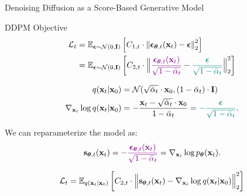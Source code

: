 \documentclass{beamer}
\renewcommand{\eqpause}{}
\renewcommand{\nextonslide}[1]{#1}
\begin{document}
\begin{frame}{Denoising Diffusion as a Score-Based Generative Model}
	\begin{block}{DDPM Objective}
		\vspace{-0.7cm}
		\begin{align*}
			\cL_t &= \bbE_{\bepsilon \sim \cN(0, \bI)} \left[ C_{1, t} \cdot \left\|  \bepsilon_{\btheta, t} (\bx_t) - \bepsilon\right\|_2^2  \right] \\
			\nextonslide{
			& = \bbE_{\bepsilon \sim \cN(0, \bI)} \left[ C_{2, t} \cdot \Bigl\| {\color{violet} \frac{\bepsilon_{\btheta, t}  (\bx_t) }{\sqrt{1 - \bar{\alpha}_t}}} - {\color{teal}\frac{\bepsilon}{\sqrt{1 - \bar{\alpha}_t}}}\Bigr\|_2^2  \right]
			}
		\end{align*}
		\vspace{-0.7cm}
	\end{block}
	\eqpause
	\vspace{-0.5cm}
	\begin{align*}
		q(\bx_t | \bx_0) &= \cN(\sqrt{\bar{\alpha}_t} \cdot \bx_0, (1 - \bar{\alpha}_t) \cdot \bI) \\
		\nextonslide{\nabla_{\bx_t} \log q(\bx_t | \bx_0) &= - \frac{\bx_t - \sqrt{\bar{\alpha}_t} \cdot \bx_0}{1 - \bar{\alpha}_t} = {\color{teal}-  \frac{\bepsilon}{\sqrt{1 - \bar{\alpha}_t}}}.}
	\end{align*}
	\eqpause
	We can reparameterize the model as: 
		\vspace{-0.2cm}
		\[
			\mathbf{s}_{\boldsymbol{\theta}, t}(\mathbf{x}_t) = {\color{violet}- \frac{\boldsymbol{\epsilon}_{\boldsymbol{\theta}, t}(\mathbf{x}_t)}{\sqrt{1 - \bar{\alpha}_t}}} = \nabla_{\mathbf{x}_t} \log p_{\boldsymbol{\theta}}(\mathbf{x}_t).
		\]
		\vspace{-0.3cm}
		\eqpause
		\[
			\mathcal{L}_t = \mathbb{E}_{q(\mathbf{x}_t | \mathbf{x}_0)} \left[ C_{2, t} \cdot \Bigl\|  \mathbf{s}_{\boldsymbol{\theta}, t} (\mathbf{x}_t) - \nabla_{\mathbf{x}_t} \log q(\mathbf{x}_t | \mathbf{x}_0) \Bigr\|_2^2  \right]
		\]
\end{frame}
\end{document}
